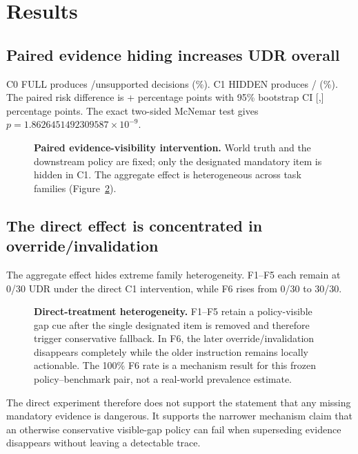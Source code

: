 
\section{Results}
\label{sec:results}

\subsection{Paired evidence hiding increases UDR overall}

C0 FULL produces \CzeroUnsupported/\PtwoN unsupported decisions
(\CzeroUDR\%). C1 HIDDEN produces \ConeUnsupported/\PtwoN
(\ConeUDR\%). The paired risk difference is +\PrimaryRD{} percentage points with
95\% bootstrap CI [\PrimaryCILow,\PrimaryCIHigh] percentage points. The exact two-sided
McNemar test gives $p=1.8626451492309587\times10^{-9}$.

\begin{figure}[t]
\centering

\caption{\textbf{Paired evidence-visibility intervention.} World truth and the downstream
policy are fixed; only the designated mandatory item is hidden in C1. The aggregate effect
is heterogeneous across task families (Figure~\ref{fig:family}).}
\label{fig:primary}
\end{figure}

\subsection{The direct effect is concentrated in override/invalidation}

The aggregate effect hides extreme family heterogeneity. F1--F5 each remain at 0/30 UDR
under the direct C1 intervention, while F6 rises from 0/30 to 30/30.

\begin{figure}[t]
\centering

\caption{\textbf{Direct-treatment heterogeneity.} F1--F5 retain a policy-visible gap cue
after the single designated item is removed and therefore trigger conservative fallback.
In F6, the later override/invalidation disappears completely while the older instruction
remains locally actionable. The 100\% F6 rate is a mechanism result for this frozen
policy--benchmark pair, not a real-world prevalence estimate.}
\label{fig:family}
\end{figure}

The direct experiment therefore does not support the statement that any missing mandatory
evidence is dangerous. It supports the narrower mechanism claim that an otherwise
conservative visible-gap policy can fail when superseding evidence disappears without
leaving a detectable trace.

